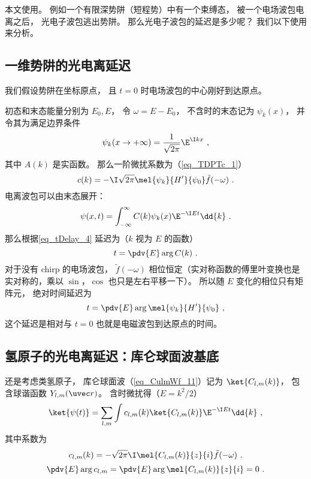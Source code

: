 

本文使用。 例如一个有限深势阱（短程势）中有一个束缚态， 被一个电场波包电离之后， 光电子波包逃出势阱。 那么光电子波包的延迟是多少呢？ 我们以下使用来分析。

\subsection{一维势阱的光电离延迟}
我们假设势阱在坐标原点， 且 $t = 0$ 时电场波包的中心刚好到达原点。

初态和末态能量分别为 $E_0, E$， 令 $\omega = E - E_0$， 不含时的末态记为 $\psi_k(x)$， 并令其为满足边界条件
\begin{equation}\label{eq_HeAna2_2}
\psi_k(x \to +\infty) = \frac{1}{\sqrt{2\pi}}\E^{\I kx}~,
\end{equation}
其中 $A(k)$ 是实函数。 那么一阶微扰系数为（\autoref{eq_TDPTc_1}）
\begin{equation}
c(k) = -\I \sqrt{2\pi} \mel{\psi_k}{H'}{\psi_0} \tilde f(-\omega)~.
\end{equation}
电离波包可以由末态展开：
\begin{equation}
\psi(x, t) = \int_{-\infty}^{\infty} C(k) \psi_k(x)\E^{-\I E t} \dd{k}~.
\end{equation}
那么根据\autoref{eq_tDelay_4}  延迟为（$k$ 视为 $E$ 的函数）
\begin{equation}\label{eq_HeAna2_3}
t = \pdv{E} \arg C(k)~.
\end{equation}
对于没有 chirp 的电场波包， $\tilde f(-\omega)$ 相位恒定（实对称函数的傅里叶变换也是实对称的，乘以 $\sin$，$\cos$ 也只是左右平移一下）。 所以随 $E$ 变化的相位只有矩阵元， 绝对时间延迟为
\begin{equation}\label{eq_HeAna2_1}
t = \pdv{E} \arg \mel{\psi_k}{H'}{\psi_0}~,
\end{equation}
这个延迟是相对与 $t = 0$ 也就是电磁波包到达原点的时间。

\subsection{氢原子的光电离延迟：库仑球面波基底}\label{sub_HeAna2_1}
还是考虑类氢原子， 库仑球面波（\autoref{eq_CulmWf_11}）记为 $\ket{C_{l,m}(k)}$， 包含球谐函数 $Y_{l,m}(\uvec r)$。 含时微扰得（$E = k^2/2$）
\begin{equation}\label{eq_HeAna2_4}
\ket{\psi(t)} = \sum_{l,m} \int c_{l,m}(k) \ket{C_{l,m}(k)} \E^{-\I E t} \dd{k}~,
\end{equation}
其中系数为
\begin{equation}
c_{l,m}(k) = -\sqrt{2\pi}\I \mel{C_{l,m}(k)}{z}{i} \tilde f(-\omega)~.
\end{equation}
\begin{equation}
\pdv{E}\arg c_{l,m} = \pdv{E} \arg \mel{C_{l,m}(k)}{z}{i} = 0~.
\end{equation}


